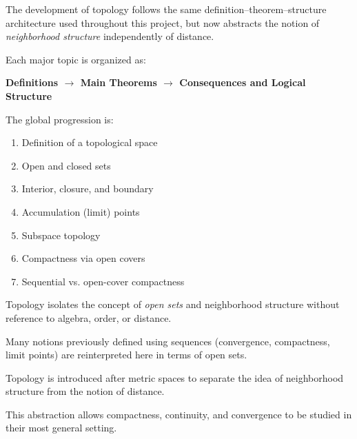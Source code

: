 The development of topology follows the same
definition--theorem--structure architecture used throughout
this project, but now abstracts the notion of
\emph{neighborhood structure} independently of distance.

Each major topic is organized as:
\begin{center}
\textbf{Definitions $\longrightarrow$ Main Theorems $\longrightarrow$ Consequences and Logical Structure}
\end{center}

The global progression is:

\begin{enumerate}
  \item Definition of a topological space
  \item Open and closed sets
  \item Interior, closure, and boundary
  \item Accumulation (limit) points
  \item Subspace topology
  \item Compactness via open covers
  \item Sequential vs. open-cover compactness
\end{enumerate}

\vspace{1em}

\begin{remark}
Topology isolates the concept of
\emph{open sets} and neighborhood structure
without reference to algebra, order, or distance.
\end{remark}

\begin{remark}
Many notions previously defined using sequences
(convergence, compactness, limit points)
are reinterpreted here in terms of open sets.
\end{remark}






% 
% 
% 
% 


\begin{remark}
Topology is introduced after metric spaces
to separate the idea of neighborhood structure
from the notion of distance.

This abstraction allows compactness,
continuity, and convergence to be studied
in their most general setting.
\end{remark}
